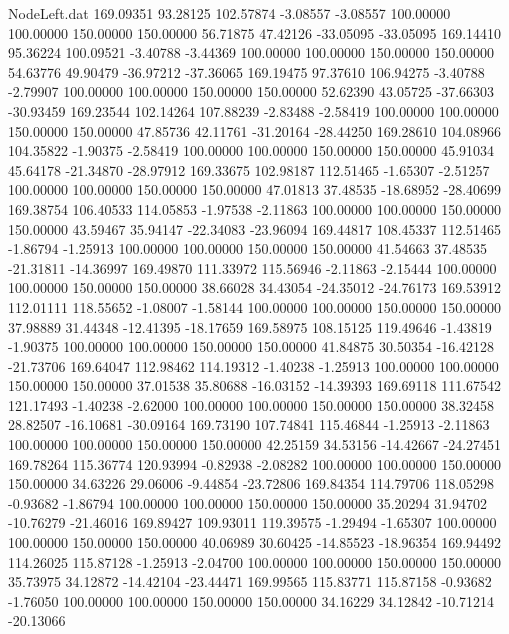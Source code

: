 \begin{filecontents}{NodeLeft.dat}
 169.09351   93.28125  102.57874    -3.08557   -3.08557  100.00000  100.00000  150.00000  150.00000   56.71875   47.42126  -33.05095  -33.05095
 169.14410   95.36224  100.09521    -3.40788   -3.44369  100.00000  100.00000  150.00000  150.00000   54.63776   49.90479  -36.97212  -37.36065
 169.19475   97.37610  106.94275    -3.40788   -2.79907  100.00000  100.00000  150.00000  150.00000   52.62390   43.05725  -37.66303  -30.93459
 169.23544  102.14264  107.88239    -2.83488   -2.58419  100.00000  100.00000  150.00000  150.00000   47.85736   42.11761  -31.20164  -28.44250
 169.28610  104.08966  104.35822    -1.90375   -2.58419  100.00000  100.00000  150.00000  150.00000   45.91034   45.64178  -21.34870  -28.97912
 169.33675  102.98187  112.51465    -1.65307   -2.51257  100.00000  100.00000  150.00000  150.00000   47.01813   37.48535  -18.68952  -28.40699
 169.38754  106.40533  114.05853    -1.97538   -2.11863  100.00000  100.00000  150.00000  150.00000   43.59467   35.94147  -22.34083  -23.96094
 169.44817  108.45337  112.51465    -1.86794   -1.25913  100.00000  100.00000  150.00000  150.00000   41.54663   37.48535  -21.31811  -14.36997
 169.49870  111.33972  115.56946    -2.11863   -2.15444  100.00000  100.00000  150.00000  150.00000   38.66028   34.43054  -24.35012  -24.76173
 169.53912  112.01111  118.55652    -1.08007   -1.58144  100.00000  100.00000  150.00000  150.00000   37.98889   31.44348  -12.41395  -18.17659
 169.58975  108.15125  119.49646    -1.43819   -1.90375  100.00000  100.00000  150.00000  150.00000   41.84875   30.50354  -16.42128  -21.73706
 169.64047  112.98462  114.19312    -1.40238   -1.25913  100.00000  100.00000  150.00000  150.00000   37.01538   35.80688  -16.03152  -14.39393
 169.69118  111.67542  121.17493    -1.40238   -2.62000  100.00000  100.00000  150.00000  150.00000   38.32458   28.82507  -16.10681  -30.09164
 169.73190  107.74841  115.46844    -1.25913   -2.11863  100.00000  100.00000  150.00000  150.00000   42.25159   34.53156  -14.42667  -24.27451
 169.78264  115.36774  120.93994    -0.82938   -2.08282  100.00000  100.00000  150.00000  150.00000   34.63226   29.06006   -9.44854  -23.72806
 169.84354  114.79706  118.05298    -0.93682   -1.86794  100.00000  100.00000  150.00000  150.00000   35.20294   31.94702  -10.76279  -21.46016
 169.89427  109.93011  119.39575    -1.29494   -1.65307  100.00000  100.00000  150.00000  150.00000   40.06989   30.60425  -14.85523  -18.96354
 169.94492  114.26025  115.87128    -1.25913   -2.04700  100.00000  100.00000  150.00000  150.00000   35.73975   34.12872  -14.42104  -23.44471
 169.99565  115.83771  115.87158    -0.93682   -1.76050  100.00000  100.00000  150.00000  150.00000   34.16229   34.12842  -10.71214  -20.13066

\end{filecontents}

